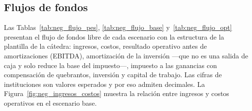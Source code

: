 \subsection{Flujos de fondos}

Las Tablas~\ref{tab:neg_flujo_pes}, \ref{tab:neg_flujo_base} y~\ref{tab:neg_flujo_opt} presentan el flujo de fondos libre de cada escenario con la estructura de la plantilla de la cátedra: ingresos, costos, resultado operativo antes de amortizaciones (EBITDA), amortización de la inversión ---que no es una salida de caja y solo reduce la base del impuesto---, impuesto a las ganancias con compensación de quebrantos, inversión y capital de trabajo. Las cifras de instituciones son valores esperados y por eso admiten decimales. La Figura~\ref{fig:neg_ingresos_costos} muestra la relación entre ingresos y costos operativos en el escenario base.

